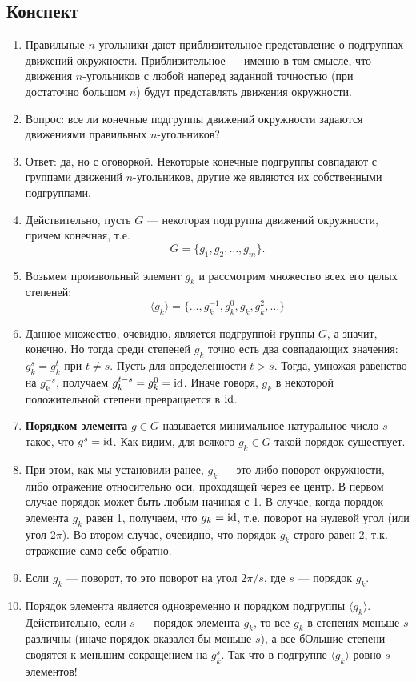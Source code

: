 \subsection*{Конспект}
\begin{enumerate}\setlength{\itemsep}{1pt}
\item Правильные $n$-угольники дают приблизительное представление о подгруппах движений окружности. Приблизительное --- именно в том смысле, что движения $n$-угольников с любой наперед заданной точностью (при достаточно большом $n$) будут представлять движения окружности.
\item Вопрос: все ли конечные подгруппы движений окружности задаются движениями правильных $n$-угольников?
\item Ответ: да, но с оговоркой. Некоторые конечные подгруппы совпадают с группами движений $n$-угольников, другие же являются их собственными подгруппами.
\item Действительно, пусть $G$ --- некоторая подгруппа движений окружности, причем конечная, т.е.
$$
G=\{g_1,g_2,\dots,g_m\}.
$$
\item Возьмем произвольный элемент $g_k$ и рассмотрим множество всех его целых степеней:
$$
\langle g_k\rangle=\{\dots,g_k^{-1},g_k^0,g_k,g_k^2,\dots\}
$$
\item Данное множество, очевидно, является подгруппой группы $G$, а значит, конечно. Но тогда среди степеней $g_k$ точно есть два совпадающих значения: $g_k^s=g_k^t$ при $t\ne s$. Пусть для определенности $t>s$. Тогда, умножая равенство на $g_k^{-s}$, получаем $g_k^{t-s}=g_k^0=\mathrm{id}$. Иначе говоря, $g_k$ в некоторой положительной степени превращается в $\mathrm{id}$.
\item \textbf{Порядком элемента} $g\in G$ называется минимальное натуральное число $s$ такое, что $g^s=\mathrm{id}$. Как видим, для всякого $g_k\in G$ такой порядок существует.
\item При этом, как мы установили ранее, $g_k$ --- это либо поворот окружности, либо отражение относительно оси, проходящей через ее центр. В первом случае порядок может быть любым начиная с 1. В случае, когда порядок элемента $g_k$ равен 1, получаем, что $g_k=\mathrm{id}$, т.е. поворот на нулевой угол (или угол $2\pi$). Во втором случае, очевидно, что порядок $g_k$ строго равен 2, т.к. отражение само себе обратно.
\item Если $g_k$ --- поворот, то это поворот на угол $2\pi/s$, где $s$ --- порядок $g_k$.
\item Порядок элемента является одновременно и порядком подгруппы $\langle g_k\rangle$. Действительно, если $s$ --- порядок элемента $g_k$, то все $g_k$ в степенях меньше $s$ различны (иначе порядок оказался бы меньше $s$), а все бОльшие степени сводятся к меньшим сокращением на $g_k^s$. Так что в подгруппе $\langle g_k\rangle$ ровно $s$ элементов!

\end{enumerate}

